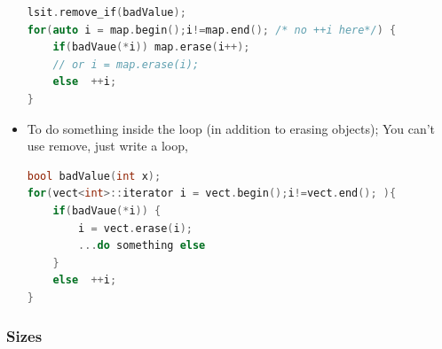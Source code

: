 \documentclass[a4paper,12pt,twoside]{book}
\begin{document}
\begin{itemize}
\begin{lstlisting}[frame=single, language=c++]
lsit.remove_if(badValue);
for(auto i = map.begin();i!=map.end(); /* no ++i here*/) {
	if(badVaue(*i)) map.erase(i++);
	// or i = map.erase(i);
	else  ++i;
}
\end{lstlisting}

\item  To do something inside the loop (in addition to erasing objects);  You can't use remove, just write a loop,
\begin{lstlisting}[frame=single, language=c++]
bool badValue(int x);
for(vect<int>::iterator i = vect.begin();i!=vect.end(); ){
	if(badVaue(*i)) {
		i = vect.erase(i);
		...do something else
	}
	else  ++i;
}
\end{lstlisting}

\end{itemize}


\subsubsection{Sizes}
\end{document}
